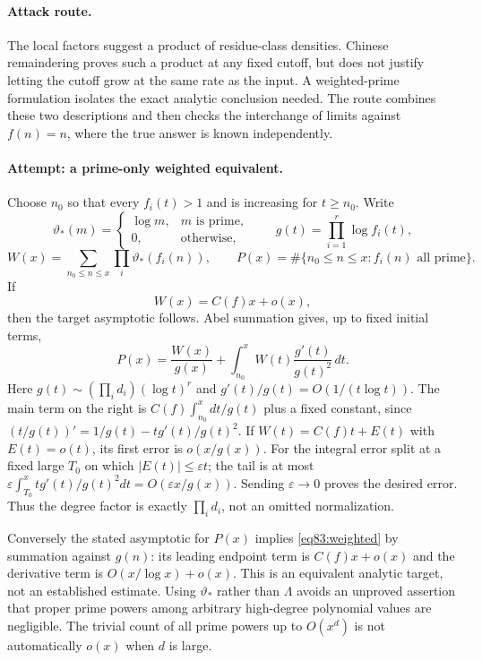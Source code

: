 \documentclass[11pt,a4paper]{article}
\numberwithin{equation}{section}
\begin{document}
\paragraph{Attack route.}
The local factors suggest a product of residue-class densities. Chinese
remaindering proves such a product at any fixed cutoff, but does not justify
letting the cutoff grow at the same rate as the input. A weighted-prime
formulation isolates the exact analytic conclusion needed. The route
combines these two descriptions and then checks the interchange of limits
against $f(n)=n$, where the true answer is known independently.

\paragraph{Attempt: a prime-only weighted equivalent.}
Choose $n_0$ so that every $f_i(t)>1$ and is increasing for $t\geq n_0$.
Write
\[
 \vartheta_*(m)=\begin{cases}\log m,&m\text{ is prime},\\0,&\text{otherwise},\end{cases}
 \qquad g(t)=\prod_{i=1}^r\log f_i(t),
\]
\[
 W(x)=\sum_{n_0\leq n\leq x}\prod_i\vartheta_*(f_i(n)),
 \qquad P(x)=\#\{n_0\leq n\leq x:f_i(n)\text{ all prime}\}.
\]
If
\begin{equation}\label{eq83:weighted}
 W(x)=C(f)x+o(x),
\end{equation}
then the target asymptotic follows. Abel summation gives, up to fixed
initial terms,
\begin{equation}\label{eq83:abel}
 P(x)=\frac{W(x)}{g(x)}+
              \int_{n_0}^x W(t)\frac{g'(t)}{g(t)^2}\,dt.
\end{equation}
Here
$g(t)\sim(\prod_i d_i)(\log t)^r$ and
$g'(t)/g(t)=O(1/(t\log t))$. The main term on the right is
$C(f)\int_{n_0}^xdt/g(t)$ plus a fixed constant, since
$(t/g(t))'=1/g(t)-t g'(t)/g(t)^2$.
If $W(t)=C(f)t+E(t)$ with $E(t)=o(t)$, its first error is
$o(x/g(x))$. For the integral error split at a fixed large $T_0$ on which
$|E(t)|\leq\varepsilon t$; the tail is at most
$\varepsilon\int_{T_0}^x t g'(t)/g(t)^2dt=O(\varepsilon x/g(x))$.
Sending $\varepsilon\to0$ proves the desired error. Thus the degree factor
is exactly $\prod_i d_i$, not an omitted normalization.

Conversely the stated asymptotic for $P(x)$ implies
\eqref{eq83:weighted} by summation against $g(n)$: its leading endpoint
term is $C(f)x+o(x)$ and the derivative term is $O(x/\log x)+o(x)$.
This is an equivalent analytic target, not an established estimate.
Using $\vartheta_*$ rather than $\Lambda$ avoids an unproved assertion
that proper prime powers among arbitrary high-degree polynomial values
are negligible. The trivial count of all prime powers up to $O(x^d)$
is not automatically $o(x)$ when $d$ is large.
\end{document}
